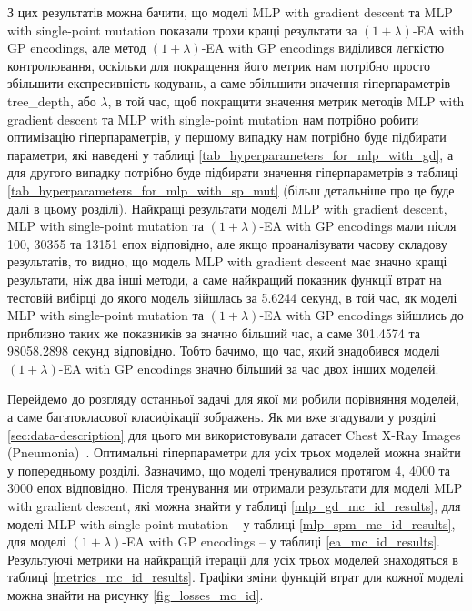 З цих результатів можна бачити, що моделі MLP with gradient descent та MLP with single-point mutation показали трохи кращі результати за $(1+\lambda)$-EA with GP encodings, але метод $(1+\lambda)$-EA with GP encodings виділився легкістю контролювання, оскільки для покращення його метрик нам потрібно просто збільшити експресивність кодувань, а саме збільшити значення гіперпараметрів tree\_depth, або $\lambda$, в той час, щоб покращити значення метрик методів MLP with gradient descent та MLP with single-point mutation нам потрібно робити оптимізацію гіперпараметрів, у першому випадку нам потрібно буде підбирати параметри, які наведені у таблиці \ref{tab_hyperparameters_for_mlp_with_gd}, а для другого випадку потрібно буде підбирати значення гіперпараметрів з таблиці \ref{tab_hyperparameters_for_mlp_with_sp_mut} (більш детальніше про це буде далі в цьому розділі). Найкращі результати моделі MLP with gradient descent, MLP with single-point mutation та $(1+\lambda)$-EA with GP encodings мали після 100, 30355 та 13151 епох відповідно, але якщо проаналізувати часову складову результатів, то видно, що модель MLP with gradient descent має значно кращі результати, ніж два інші методи, а саме найкращий показник функції втрат на тестовій вибірці до якого модель зійшлась за 5.6244 секунд, в той час, як моделі MLP with single-point mutation та $(1+\lambda)$-EA with GP encodings зійшлись до приблизно таких же показників за значно більший час, а саме 301.4574 та 98058.2898 секунд відповідно. Тобто бачимо, що час, який знадобився моделі $(1+\lambda)$-EA with GP encodings значно більший за час двох інших моделей.

Перейдемо до розгляду останньої задачі для якої ми робили порівняння моделей, а саме багатокласової класифікації зображень. Як ми вже згадували у розділі \ref{sec:data-description} для цього ми використовували датасет Chest X-Ray Images (Pneumonia)~\cite{ct32}. Оптимальні гіперпараметри для усіх трьох моделей можна знайти у попередньому розділі. Зазначимо, що моделі тренувалися протягом 4, 4000 та 3000 епох відповідно. Після тренування ми отримали результати для моделі MLP with gradient descent, які можна знайти у таблиці \ref{mlp_gd_mc_id_results}, для моделі MLP with single-point mutation -- у таблиці \ref{mlp_spm_mc_id_results}, для моделі $(1+\lambda)$-EA with GP encodings -- у таблиці \ref{ea_mc_id_results}. Результуючі метрики на найкращій ітерації для усіх трьох моделей знаходяться в таблиці \ref{metrics_mc_id_results}. Графіки зміни функцій втрат для кожної моделі можна знайти на рисунку \ref{fig_losses_mc_id}.

